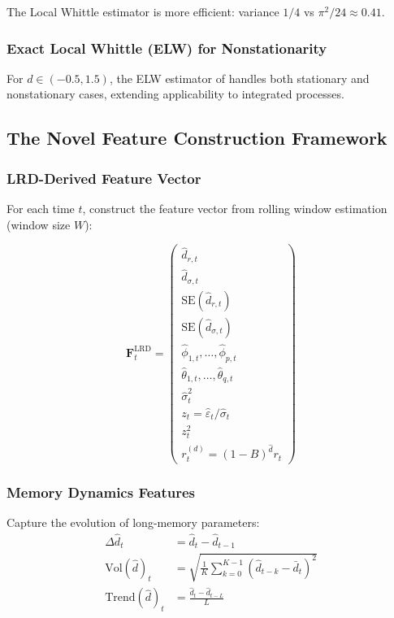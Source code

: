 \documentclass[11pt,a4paper]{article}
\theoremstyle{definition}
\newcommand{\dhat}{\hat{d}}
\newcommand{\sigmahat}{\hat{\sigma}}
\newcommand{\phihat}{\hat{\phi}}
\newcommand{\thetahat}{\hat{\theta}}
\begin{document}
The Local Whittle estimator is more efficient: variance $1/4$ vs $\pi^2/24 \approx 0.41$.

\subsubsection{Exact Local Whittle (ELW) for Nonstationarity}

For $d \in (-0.5, 1.5)$, the ELW estimator of \citet{shimotsu2005exact} handles both stationary and nonstationary cases, extending applicability to integrated processes.

\subsection{The Novel Feature Construction Framework}

\subsubsection{LRD-Derived Feature Vector}

For each time $t$, construct the feature vector from rolling window estimation (window size $W$):

\begin{equation}
    \mathbf{F}_t^{\text{LRD}} = \begin{pmatrix} 
        \dhat_{r,t} \\[0.2em]
        \dhat_{\sigma,t} \\[0.2em]
        \text{SE}(\dhat_{r,t}) \\[0.2em]
        \text{SE}(\dhat_{\sigma,t}) \\[0.2em]
        \phihat_{1,t}, \ldots, \phihat_{p,t} \\[0.2em]
        \thetahat_{1,t}, \ldots, \thetahat_{q,t} \\[0.2em]
        \sigmahat_t^2 \\[0.2em]
        z_t = \hat{\varepsilon}_t / \sigmahat_t \\[0.2em]
        z_t^2 \\[0.2em]
        r_t^{(d)} = (1-B)^{\dhat} r_t
    \end{pmatrix}
\end{equation}

\subsubsection{Memory Dynamics Features}

Capture the evolution of long-memory parameters:
\begin{align}
    \Delta \dhat_t &= \dhat_t - \dhat_{t-1} \\
    \text{Vol}(\dhat)_t &= \sqrt{\frac{1}{K}\sum_{k=0}^{K-1}(\dhat_{t-k} - \bar{d}_t)^2} \\
    \text{Trend}(\dhat)_t &= \frac{\dhat_t - \dhat_{t-L}}{L}
\end{align}
\end{document}
